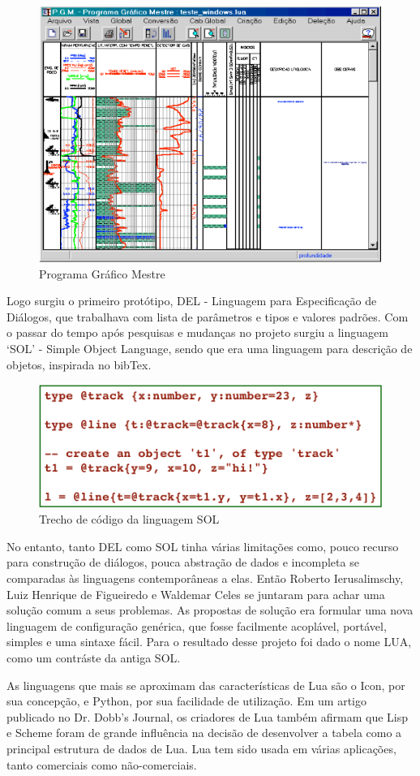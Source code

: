 \documentclass[
12pt, %
openright, %
oneside, %
a4paper, %
english, %
brazil, %
]{abntex2}
\begin{document}
\begin{figure}[H]
\centering
\includegraphics[width=0.5\linewidth]{imagens/imagem1.png}
\caption{Programa Gráfico Mestre}
\end{figure}

Logo surgiu o primeiro protótipo, DEL - Linguagem para Especificação de Diálogos, que trabalhava com lista de parâmetros e tipos e valores padrões. Com o passar do tempo após pesquisas e mudanças no projeto surgiu a linguagem `SOL' - Simple Object Language, sendo que era uma linguagem para descrição de objetos, inspirada no bibTex.

\begin{figure}[H]
\centering
\includegraphics[width=0.5\linewidth]{imagens/imagem2.png}
\caption{Trecho de código da linguagem SOL}
\end{figure}

No entanto, tanto DEL como SOL tinha várias limitações como, pouco recurso para construção de diálogos, pouca abstração de dados e incompleta se comparadas às linguagens contemporâneas a elas. Então Roberto Ierusalimschy, Luiz Henrique de Figueiredo e Waldemar Celes se juntaram para achar uma solução comum a seus problemas. As propostas de solução era formular uma nova linguagem de configuração genérica, que fosse facilmente acoplável, portável, simples e uma sintaxe fácil. Para o resultado desse projeto foi dado o nome LUA, como um contráste da antiga SOL.

As linguagens que mais se aproximam das características de Lua são o Icon, por sua concepção, e Python, por sua facilidade de utilização. Em um artigo publicado no Dr. Dobb's Journal, os criadores de Lua também afirmam que Lisp e Scheme foram de grande influência na decisão de desenvolver a tabela como a principal estrutura de dados de Lua. Lua tem sido usada em várias aplicações, tanto comerciais como não-comerciais.
\end{document}

